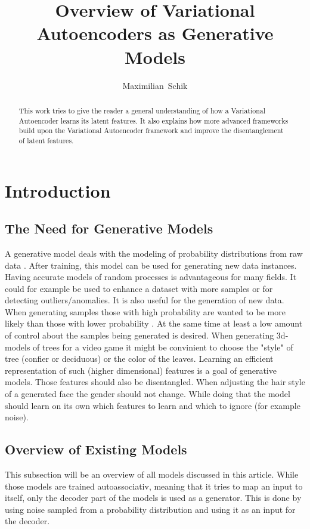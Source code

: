 \documentclass[a4paper]{IEEEtran}
\title{Overview of Variational Autoencoders as Generative Models}
\author{Maximilian~Schik}
\begin{document}
\maketitle

\begin{abstract}
This work tries to give the reader a general understanding of how a Variational Autoencoder learns its latent features. It also explains how more advanced frameworks build upon the Variational Autoencoder framework and improve the disentanglement of latent features.
\end{abstract}

\section{Introduction}
\subsection{The Need for Generative Models}
A generative model deals with the modeling of probability distributions from raw data \cite{doersch2016tutorial}. After training, this model can be used for generating new data instances. Having accurate models of random processes is advantageous for many fields. It could for example be used to enhance a dataset with more samples or for detecting outliers/anomalies. It is also useful for the generation of new data. When generating samples those with high probability are wanted to be more likely than those with lower probability \cite{doersch2016tutorial}. At the same time at least a low amount of control about the samples being generated is desired. When generating 3d-models of trees for a video game \cite{doersch2016tutorial} it might be convinient to choose the "style" of tree (confier or deciduous) or the color of the leaves. Learning an efficient representation of such (higher dimensional) features is a goal of generative models. Those features should also be disentangled. When adjusting the hair style of a generated face the gender should not change. While doing that the model should learn on its own which features to learn and which to ignore (for example noise).

\subsection{Overview of Existing Models}
This subsection will be an overview of all models discussed in this article. While those models are trained autoassociativ, meaning that it tries to map an input to itself, only the decoder part of the models is used as a generator. This is done by using noise sampled from a probability distribution and using it as an input for the decoder.
\end{document}
